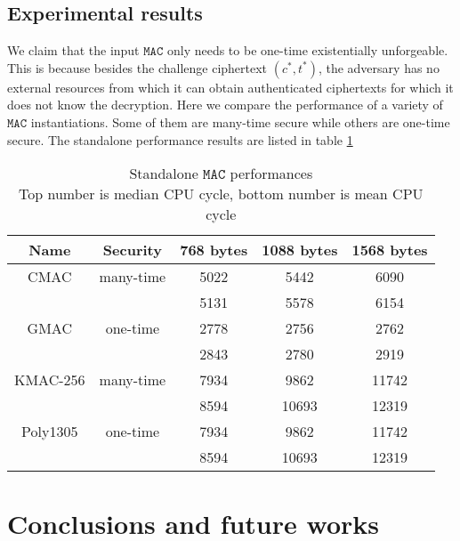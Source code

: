 \documentclass[floatrow,journal=tches,submission]{iacrtrans}
\newcommand{\monospace}{\texttt}
\newcommand{\mac}{\monospace{MAC}}
\begin{document}
\subsection{Experimental results}\label{sec:exp-results}
We claim that the input $\mac$ only needs to be one-time existentially unforgeable. This is because besides the challenge ciphertext $(c^\ast, t^\ast)$, the adversary has no external resources from which it can obtain authenticated ciphertexts for which it does not know the decryption. Here we compare the performance of a variety of $\mac$ instantiations. Some of them are many-time secure while others are one-time secure. The standalone performance results are listed in table \ref{tbl:standalone-mac-perf}

\begin{table}[H]
    \centering
    \begin{tabular}{|c|c|c|c|c|}
        \hline
        Name & Security & 768 bytes & 1088 bytes & 1568 bytes \\
        \hline
        CMAC & many-time & 5022 & 5442 & 6090 \\
        & & 5131 & 5578 & 6154 \\
        \hline
        GMAC & one-time & 2778 & 2756 & 2762 \\
        & & 2843 & 2780 & 2919 \\
        \hline
        KMAC-256 & many-time & 7934 & 9862 & 11742 \\
        & & 8594 & 10693 & 12319 \\
        \hline
        Poly1305 & one-time & 7934 & 9862 & 11742 \\
        & & 8594 & 10693 & 12319 \\
        \hline
    \end{tabular}
    \caption{Standalone $\mac$ performances\\
    Top number is median CPU cycle, bottom number is mean CPU cycle
    }\label{tbl:standalone-mac-perf}
\end{table}


\section{Conclusions and future works}\label{sec:future-works}



\end{document}
